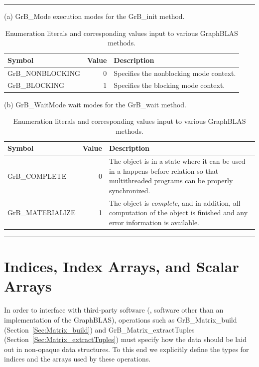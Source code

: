 \begin{table}[h]
\hrule
\begin{center}
\caption{Enumeration literals and corresponding values input to various GraphBLAS methods.}
\label{Tab:EnumerationModes}

\vspace{1\baselineskip}
(a) {\sf GrB\_Mode} execution modes for the {\sf GrB\_init} method.
\vspace{1\baselineskip}

\begin{tabular}{l|r|p{4in}}
Symbol    & Value & Description \\ \hline
{\sf GrB\_NONBLOCKING}   &  0 & Specifies the nonblocking mode context.\\
{\sf GrB\_BLOCKING}      &  1 & Specifies the blocking mode context. \\
\end{tabular}

\vspace{2\baselineskip}
(b) {\sf GrB\_WaitMode} wait modes for the {\sf GrB\_wait} method.
\vspace{1\baselineskip}

\begin{tabular}{l|r|p{4in}}
Symbol    & Value & Description \\ \hline
{\sf GrB\_COMPLETE}    &  0 & The object is in a state where it can be used in a happens-before relation so that multithreaded programs can be properly synchronized.\\
{\sf GrB\_MATERIALIZE} &  1 & The object is \emph{complete}, and in addition, all computation of the object is finished and any error information is available. \\
\end{tabular}

\end{center}
\hrule
\end{table}

\section{Indices, Index Arrays, and Scalar Arrays}

In order to interface with third-party software (\ie, software other than
an implementation of the GraphBLAS), operations 
such as {\sf GrB\_Matrix\_build} (Section~\ref{Sec:Matrix_build}) and
{\sf GrB\_Matrix\_extractTuples} (Section~\ref{Sec:Matrix_extractTuples}) must specify
how the data should be laid out in  non-opaque data structures.  To 
this end we explicitly define the types for indices and the arrays 
used by these operations.

